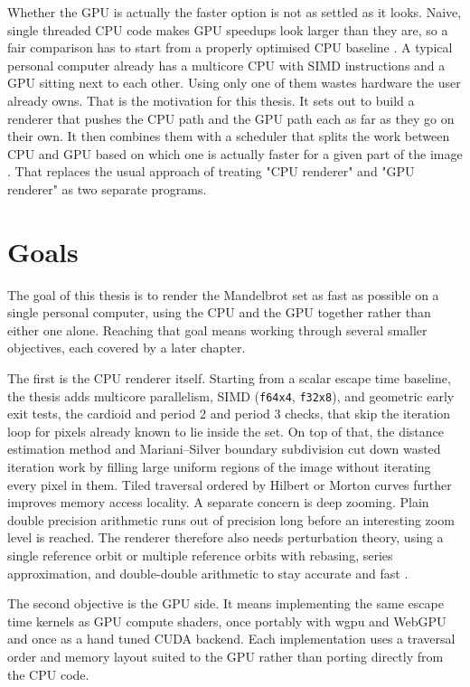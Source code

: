 \documentclass{ftndiplomski}
\begin{document}
Whether the GPU is actually the faster option is not as settled as it looks. Naive, single threaded
CPU code makes GPU speedups look larger than they are, so a fair comparison has to start from a
properly optimised CPU baseline \cite{lee2010debunking}. A typical personal computer already has a
multicore CPU with SIMD instructions and a GPU sitting next to each other. Using only one of them
wastes hardware the user already owns. That is the motivation for this thesis. It sets out to build
a renderer that pushes the CPU path and the GPU path each as far as they go on their own. It then
combines them with a scheduler that splits the work between CPU and GPU based on which one is
actually faster for a given part of the image \cite{luk2009qilin}. That replaces the usual approach
of treating "CPU renderer" and "GPU renderer" as two separate programs.

\section{Goals}
\label{sec:goals}

The goal of this thesis is to render the Mandelbrot set as fast as possible on a single personal
computer, using the CPU and the GPU together rather than either one alone. Reaching that goal
means working through several smaller objectives, each covered by a later chapter.

The first is the CPU renderer itself. Starting from a scalar escape time baseline, the thesis adds
multicore parallelism, SIMD (\texttt{f64x4}, \texttt{f32x8}), and geometric early exit tests, the
cardioid and period 2 and period 3 checks, that skip the iteration loop for pixels already known to
lie inside the set. On top of that, the distance estimation method and Mariani--Silver boundary
subdivision cut down wasted iteration work by filling large uniform regions of the image without
iterating every pixel in them. Tiled traversal ordered by Hilbert or Morton curves further improves
memory access locality. A separate concern is deep zooming. Plain double precision arithmetic runs
out of precision long before an interesting zoom level is reached. The renderer therefore also needs
perturbation theory, using a single reference orbit or multiple reference orbits with rebasing,
series approximation, and double-double arithmetic to stay accurate and fast
\cite{heilandallen2021deepzoom}.

The second objective is the GPU side. It means implementing the same escape time kernels as GPU
compute shaders, once portably with wgpu and WebGPU and once as a hand tuned CUDA backend. Each
implementation uses a traversal order and memory layout suited to the GPU rather than porting
directly from the CPU code.
\end{document}
